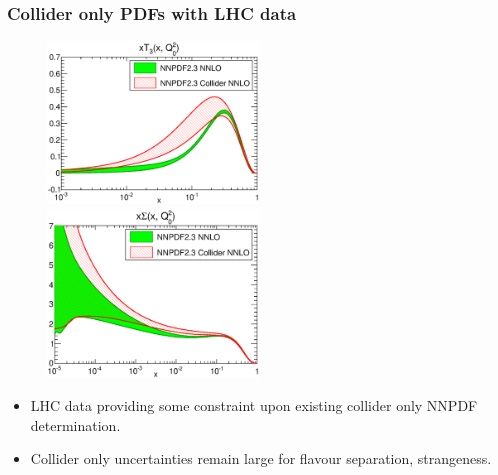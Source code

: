 \documentclass[10pt]{beamer}
\begin{document}
\begin{frame}
\frametitle{Collider only PDFs with LHC data}
 \begin{figure}[b!]
    \begin{center}
      \includegraphics[width=0.50\textwidth]{xT3_Q_2_log-23-vs-23coll-nnlo.eps}
      \includegraphics[width=0.50\textwidth]{xSinglet_Q_2_log-23-vs-23coll-nnlo}
    \end{center}
    \vskip-0.5cm
    \label{fig:pdf-jets}
\end{figure}
\vskip10pt
\begin{itemize}
\item<1-> LHC data providing some constraint upon existing collider only NNPDF determination.
\item<1-> Collider only uncertainties remain large for flavour separation, strangeness.

\end{itemize}

\end{frame}
\end{document}
